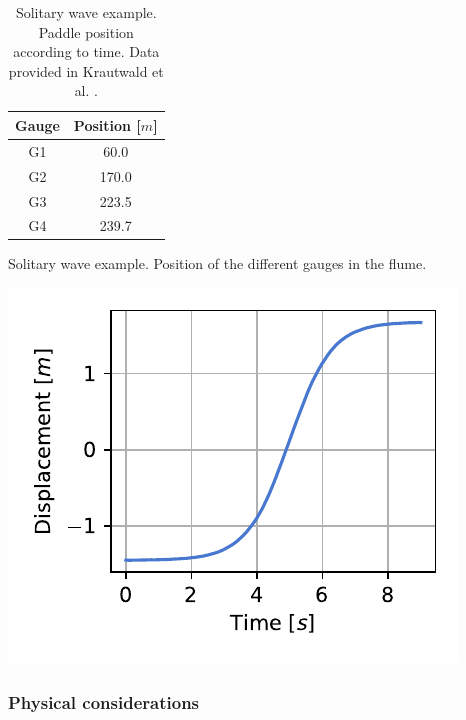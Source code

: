 \begin{table} [htb]
    \begin{minipage}[b]{.48\textwidth}
    \centering
    \begin{tabular}{cc}
        \hline
        Gauge & Position [$m$] \\ \hline
        G1    &  60.0 \\
        G2    & 170.0 \\
        G3    & 223.5 \\
        G4    & 239.7 \\ \hline
    \end{tabular} \vspace*{20pt}
    \caption{Solitary wave example. Position of the different gauges in the flume.\\}
    \label{solitary_wave_gauges_positions}
    \end{minipage}
    \hfill
    \begin{minipage}[b]{.48\textwidth}
    \centering
    \includegraphics[width=.9\textwidth]{img/coupling/piston_stroke.pdf} \vspace*{-10pt}
    \caption{Solitary wave example. Paddle position according to time. Data provided in Krautwald et al. \cite{krautwald2020,krautwald2021,krautwald2022}.}
    \label{piston_stroke}
    \end{minipage}
\end{table}

\subsubsection{Physical considerations}


